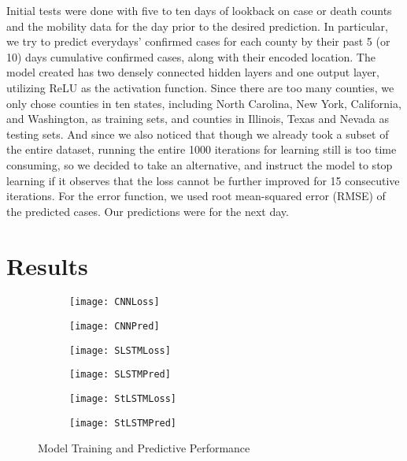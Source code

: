 ﻿\documentclass{article}
\begin{document}
\begin{multicols}{2}
Initial tests were done with five to ten days of lookback on case or death
counts and the mobility data for the day prior to the desired prediction. In
particular, we try to predict everydays’ confirmed cases for each county by
their past 5 (or 10) days cumulative confirmed cases, along with their encoded
location. The model created has two densely connected hidden layers and one
output layer, utilizing ReLU as the activation function. Since there are too
many counties, we only chose counties in ten states, including North Carolina,
New York, California, and Washington, as training sets, and counties in
Illinois, Texas and Nevada as testing sets. And since we also noticed that
though we already took a subset of the entire dataset, running the entire 1000
iterations for learning still is too time consuming, so we decided to take an
alternative, and instruct the model to stop learning if it observes that the
loss cannot be further improved for 15 consecutive iterations. For the error
function, we used root mean-squared error (RMSE) of the predicted cases. Our
predictions were for the next day.

\end{multicols}

\section*{Results}

  \begin{figure}[!htb]
    \begin{subfigure}{.5\textwidth}
      \centering
      \texttt{[image: CNNLoss]}
      \label{fig:sfig1}
    \end{subfigure}
    \begin{subfigure}{.5\textwidth}
      \centering
      \texttt{[image: CNNPred]}
      \label{fig:sfig2}
    \end{subfigure}
    \begin{subfigure}{.5\textwidth}
      \centering
      \texttt{[image: SLSTMLoss]}
      \label{fig:sfig3}
    \end{subfigure}
    \begin{subfigure}{.5\textwidth}
      \centering
      \texttt{[image: SLSTMPred]}
      \label{fig:sfig4}
    \end{subfigure}
    \begin{subfigure}{.5\textwidth}
      \centering
      \texttt{[image: StLSTMLoss]}
      \label{fig:sfig5}
    \end{subfigure}
    \begin{subfigure}{.5\textwidth}
      \centering
      \texttt{[image: StLSTMPred]}
      \label{fig:sfig6}
    \end{subfigure}
    \caption{Model Training and Predictive Performance}
    \label{fig:fig1}
  \end{figure}
\end{document}
